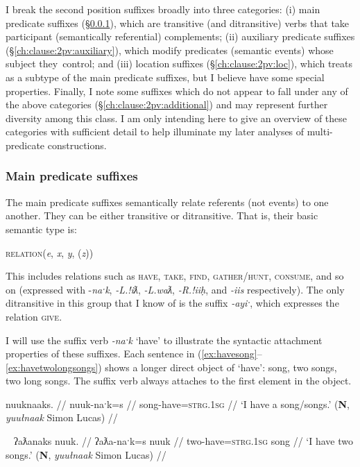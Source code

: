 I break the second position suffixes broadly into three categories: (i) main predicate suffixes (\S\ref{ch:clause:2pv:mainpredicate}), which are transitive (and ditransitive) verbs that take participant (semantically referential) complements; (ii) auxiliary predicate suffixes (\S\ref{ch:clause:2pv:auxiliary}), which modify predicates (semantic events) whose subject they control; and (iii) location suffixes (\S\ref{ch:clause:2pv:loc}), which \cite{wojdak2005} treats as a subtype of the main predicate suffixes, but I believe have some special properties. Finally, I note some suffixes which do not appear to fall under any of the above categories (\S\ref{ch:clause:2pv:additional}) and may represent further diversity among this class. I am only intending here to give an overview of these categories with sufficient detail to help illuminate my later analyses of multi-predicate constructions.

\subsubsection{Main predicate suffixes} \label{ch:clause:2pv:mainpredicate}

The main predicate suffixes semantically relate referents (not events) to one another. They can be either transitive or ditransitive. That is, their basic semantic type is:

\ex
\textsc{relation}(\textit{e}, \textit{x}, \textit{y}, (\textit{z}))
\xe

\noindent This includes relations such as \textsc{have}, \textsc{take}, \textsc{find}, \textsc{gather/hunt}, \textsc{consume}, and so on (expressed with -\textit{naˑk}, \textit{-L.!iƛ}, \textit{-L.waƛ}, \textit{-R.!iiḥ}, and \textit{-iis} respectively). The only ditransitive in this group that I know of is the suffix \textit{-ayiˑ}, which expresses the relation \textsc{give}.

I will use the suffix verb \textit{-naˑk} `have' to illustrate the syntactic attachment properties of these suffixes. Each sentence in (\ref{ex:havesong}--\ref{ex:havetwolongsongs}) shows a longer direct object of `have': song, two songs, two long songs. The suffix verb always attaches to the first element in the object.

\ex \label{ex:havesong}
\begingl
\glpreamble nuuknaaks. //
\gla nuuk-naˑk=s //
\glb song-have=\textsc{strg.1sg} //
\glft `I have a song/songs.' (\textbf{N}, \textit{yuułnaak} Simon Lucas) //
\endgl
\xe

\ex~ \label{ex:havetwosongs}
\begingl
\glpreamble ʔaƛanaks nuuk. //
\gla ʔaƛa-naˑk=s nuuk //
\glb two-have=\textsc{strg.1sg} song //
\glft `I have two songs.' (\textbf{N}, \textit{yuułnaak} Simon Lucas) //
\endgl
\xe

